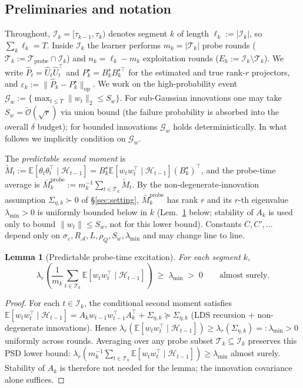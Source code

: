 \documentclass{article}
\newcommand{\E}{\mathbb{E}}
\newcommand{\op}{\mathrm{op}}
\newcommand{\cA}{\mathcal{A}}
\newcommand{\cH}{\mathcal{H}}
\newcommand{\cT}{\mathcal{T}}
\newcommand{\cI}{\mathcal{I}}
\newcommand{\cTprobe}{\mathcal{T}_{\mathrm{probe}}}
\newcommand{\tilO}{\widetilde{\mathcal{O}}}
\newtheorem{lemma}[theorem]{Lemma}
\begin{document}
\subsection{Preliminaries and notation}
\label{app:prelim}

Throughout, $\cI_k = [\tau_{k-1}, \tau_k)$ denotes segment $k$ of
length $\ell_k := |\cI_k|$, so $\sum_k \ell_k = T$. Inside $\cI_k$ the
learner performs $m_k = |\cT_k|$ probe rounds ($\cT_k := \cTprobe\cap\cI_k$)
and $n_k = \ell_k - m_k$ exploitation rounds ($E_k := \cI_k\setminus\cT_k$).
We write $\widehat P_t = \widehat U_t \widehat U_t^\top$ and
$P_k^\star = B_k^\star B_k^{\star\top}$ for the estimated and true rank-$r$
projectors, and $\varepsilon_k := \|\widehat P_k - P_k^\star\|_{\op}$.
We work on the high-probability event
$\mathcal G_w := \bigl\{\max_{t\le T}\|w_t\|_2\le S_w\bigr\}$. For sub-Gaussian innovations
one may take $S_w = \tilO(\sqrt r)$ via union bound (the failure
probability is absorbed into the overall $\delta$ budget); for bounded innovations $\mathcal G_w$ holds deterministically. In what
follows we implicitly condition on $\mathcal G_w$.

The \emph{predictable second moment} is
$\widetilde M_t := \E[\theta_t\theta_t^\top\mid\cH_{t-1}]
= B_k^\star \E[w_tw_t^\top\mid\cH_{t-1}](B_k^\star)^\top$, and the
probe-time average is
$\bar M_k^{\mathrm{probe}} := m_k^{-1}\sum_{t\in\cT_k}\widetilde M_t$.
By the non-degenerate-innovation assumption $\Sigma_{\eta,k}\succ 0$ of
\S\ref{sec:setting}, $\bar M_k^{\mathrm{probe}}$ has rank $r$ and its
$r$-th eigenvalue $\lambda_{\min}>0$ is uniformly bounded below in
$k$ (Lem.~\ref{lem:probe_excitation_conf} below; stability of $A_k$
is used only to bound $\|w_t\|\le S_w$, not for this lower bound).
Constants $C,C',\ldots$ depend only on
$\sigma_\varepsilon, R_\cA, L, \rho_Q, S_w, \lambda_{\min}$ and may
change line to line.

\begin{lemma}[Predictable probe-time excitation]
\label{lem:probe_excitation_conf}
For each segment $k$,
\[
\lambda_r\!\left(\frac{1}{m_k}\sum_{t\in\cT_k}\E[w_tw_t^\top\mid\cH_{t-1}]\right)
\;\ge\; \lambda_{\min}\;>\;0
\qquad\text{almost surely.}
\]
\end{lemma}
\begin{proof}
For each $t\in\cI_k$, the conditional second moment satisfies
$\E[w_t w_t^\top\mid\cH_{t-1}]
= A_k w_{t-1}w_{t-1}^\top A_k^\top + \Sigma_{\eta,k}
\succeq \Sigma_{\eta,k}$
(LDS recursion + non-degenerate innovations). Hence
$\lambda_r(\E[w_tw_t^\top\mid\cH_{t-1}]) \ge \lambda_r(\Sigma_{\eta,k}) =: \lambda_{\min} > 0$
uniformly across rounds. Averaging over any probe subset
$\cT_k\subseteq\cI_k$ preserves this PSD lower bound:
$\lambda_r(m_k^{-1}\sum_{t\in\cT_k}\E[w_tw_t^\top\mid\cH_{t-1}])\ge\lambda_{\min}$
almost surely. Stability of $A_k$ is therefore not needed for the
lemma; the innovation covariance alone suffices.
\end{proof}
\end{document}
